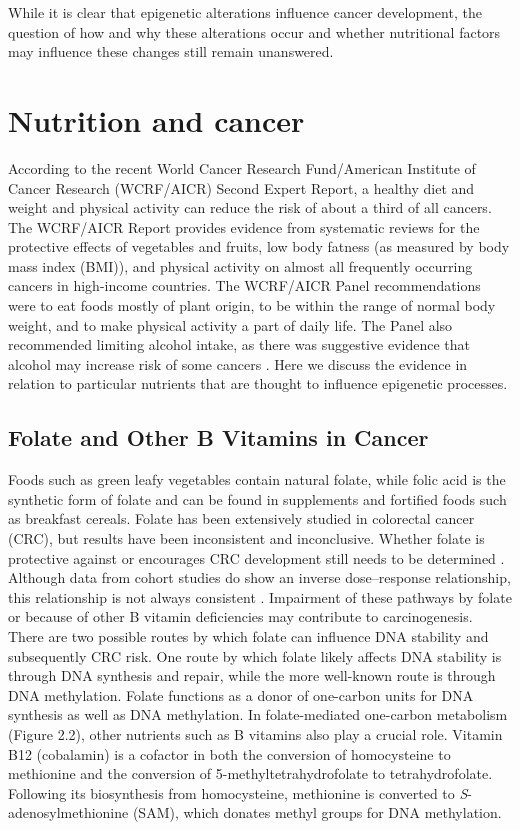\noindent While it is clear that epigenetic alterations influence cancer development, the question of how and why these alterations occur and whether nutritional factors may influence these changes still remain unanswered.
\section[]{Nutrition and cancer} %
\noindent According to the recent World Cancer Research Fund/American Institute of Cancer Research (WCRF/AICR) Second Expert Report, a healthy diet and weight and physical activity can reduce the risk of about a third of all cancers. The WCRF/AICR Report provides evidence from systematic reviews for the protective effects of vegetables and fruits, low body fatness (as measured by body mass index (BMI)), and physical activity on almost all frequently occurring cancers in high-income countries. The WCRF/AICR Panel recommendations were to eat foods mostly of plant origin, to be within the range of normal body weight, and to make physical activity a part of daily life. The Panel also recommended limiting alcohol intake, as there was suggestive evidence that alcohol may increase risk of some cancers \cite{c214}. Here we discuss the evidence in relation to particular nutrients that are thought to influence epigenetic processes.

\subsection{Folate and Other B Vitamins in Cancer} %
\noindent Foods such as green leafy vegetables contain natural folate, while folic acid is the synthetic form of folate and can be found in supplements and fortified foods such as breakfast cereals. Folate has been extensively studied in colorectal cancer (CRC), but results have been inconsistent and inconclusive. Whether folate is protective against or encourages CRC development still needs to be determined \cite{c227}. Although data from cohort studies do show an inverse dose--response relationship, this relationship is not always consistent \cite{c214}. Impairment of these pathways by folate or because of other B vitamin deficiencies may contribute to carcinogenesis. There are two possible routes by which folate can influence DNA stability and subsequently CRC risk. One route by which folate likely affects DNA stability is through DNA synthesis and repair, while the more well-known route is through DNA methylation. Folate functions as a donor of one-carbon units for DNA synthesis as well as DNA 
methylation. In folate-mediated one-carbon metabolism (Figure 2.2), other nutrients such as B vitamins also play a crucial role. Vitamin B12 (cobalamin) is a cofactor in both the conversion of homocysteine to methionine and the conversion of 5-methyltetrahydrofolate to tetrahydrofolate. Following its biosynthesis from homocysteine, methionine is converted to \emph{S}-adenosylmethionine (SAM), which donates methyl groups for DNA methylation.

